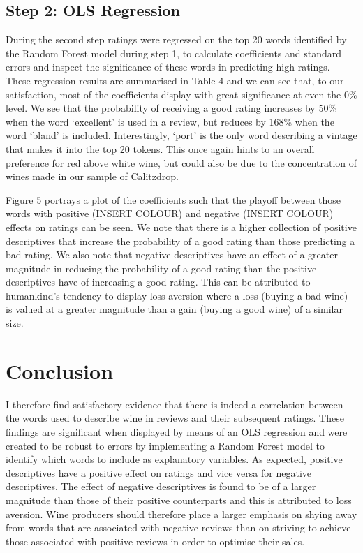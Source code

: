 \documentclass[11pt,preprint]{elsarticle}
\numberwithin{equation}{section}
\numberwithin{figure}{section}
\numberwithin{table}{section}
\begin{document}
\subsection{Step 2: OLS Regression}\label{step-2-ols-regression}

During the second step ratings were regressed on the top 20 words
identified by the Random Forest model during step 1, to calculate
coefficients and standard errors and inspect the significance of these
words in predicting high ratings. These regression results are
summarised in Table 4 and we can see that, to our satisfaction, most of
the coefficients display with great significance at even the 0\% level.
We see that the probability of receiving a good rating increases by 50\%
when the word `excellent' is used in a review, but reduces by 168\% when
the word `bland' is included. Interestingly, `port' is the only word
describing a vintage that makes it into the top 20 tokens. This once
again hints to an overall preference for red above white wine, but could
also be due to the concentration of wines made in our sample of
Calitzdrop.

Figure 5 portrays a plot of the coefficients such that the playoff
between those words with positive (INSERT COLOUR) and negative (INSERT
COLOUR) effects on ratings can be seen. We note that there is a higher
collection of positive descriptives that increase the probability of a
good rating than those predicting a bad rating. We also note that
negative descriptives have an effect of a greater magnitude in reducing
the probability of a good rating than the positive descriptives have of
increasing a good rating. This can be attributed to humankind's tendency
to display loss aversion where a loss (buying a bad wine) is valued at a
greater magnitude than a gain (buying a good wine) of a similar size.

\newpage

\section{Conclusion}\label{conclusion}

\label{Concl} I therefore find satisfactory evidence that there is
indeed a correlation between the words used to describe wine in reviews
and their subsequent ratings. These findings are significant when
displayed by means of an OLS regression and were created to be robust to
errors by implementing a Random Forest model to identify which words to
include as explanatory variables. As expected, positive descriptives
have a positive effect on ratings and vice versa for negative
descriptives. The effect of negative descriptives is found to be of a
larger magnitude than those of their positive counterparts and this is
attributed to loss aversion. Wine producers should therefore place a
larger emphasis on shying away from words that are associated with
negative reviews than on striving to achieve those associated with
positive reviews in order to optimise their sales.
\end{document}
